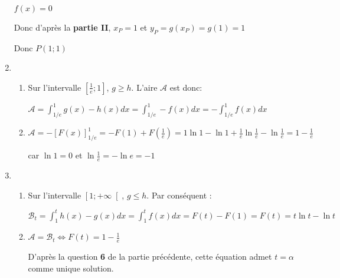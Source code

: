 \begin{corrige}
\begin{enumerate}
          $f\left(x\right)=0$
          \par
          Donc d'après la\textbf{ partie II},  $x_{P}=1$ et $y_{P}=g\left(x_{P}\right)=g\left(1\right)=1$
          \par
          Donc $P\left(1;1\right)$
          \item
          \begin{enumerate}[label=\alph*.]
               \item
               Sur l'intervalle $\left[\frac{1}{e} ; 1\right]$, $g\geqslant h$. L'aire $\mathscr A$ est donc:
               \par
               $\mathscr A=\int_{1/e}^{1}g\left(x\right)-h\left(x\right)dx = \int_{1/e}^{1}-f\left(x\right)dx = -\int_{1/e}^{1}f\left(x\right)dx$
               \item
               $\mathscr A=-\left[F\left(x\right)\right]_{1/e}^{1} = -F\left(1\right)+F\left(\frac{1}{e}\right) = 1\ln 1-\ln 1+\frac{1}{e} \ln \frac{1}{e}-\ln \frac{1}{e} = 1-\frac{1}{e}$
               \par
               car $\ln 1 = 0 $ et $ \ln \frac{1}{e} = -\ln e = -1$
          \end{enumerate}
          \item
          \begin{enumerate}[label=\alph*.]
               \item
               Sur l'intervalle $\left[1 ; +\infty \right[$, $g\leqslant h$. Par conséquent :
               \par
               $\mathscr B_{t}=\int_{1}^{t}h\left(x\right)-g\left(x\right)dx = \int_{1}^{t}f\left(x\right)dx = F\left(t\right)-F\left(1\right) = F\left(t\right) = t \ln t-\ln t$
               \item
               $\mathscr A=\mathscr B_{t}   \Leftrightarrow    F\left(t\right) = 1-\frac{1}{e}$
               \par
               D'après la question \textbf{6} de la partie précédente, cette équation admet $t=\alpha $ comme unique solution.
          \end{enumerate}
     \end{enumerate}
\end{corrige}
